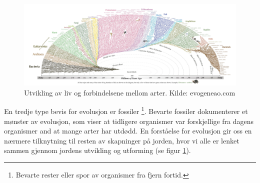 \documentclass[main.tex]{subfiles}
\begin{document}
\begin{figure}
    \label{fig:evolusjon}
    \centering
    \includegraphics[scale = 0.37]{../figures/utviklingavliv.jpg}
    \caption{Utvikling av liv og forbindelsene mellom arter. Kilde: evogeneao.com}
\end{figure}

\hspace{-6mm}En tredje type bevis for evolusjon er fossiler \footnote{Bevarte rester eller spor av organismer fra fjern fortid.}. Bevarte fossiler dokumenterer et mønster av evolusjon, som viser at tidligere organismer var forskjellige fra dagens organismer and at mange arter har utdødd.
\newline\newline
En forståelse for evolusjon gir oss en nærmere tilknytning til resten av skapninger på jorden, hvor vi alle er lenket sammen gjennom jordens utvikling og utforming (se figur \ref{fig:evolusjon}).
\end{document}
